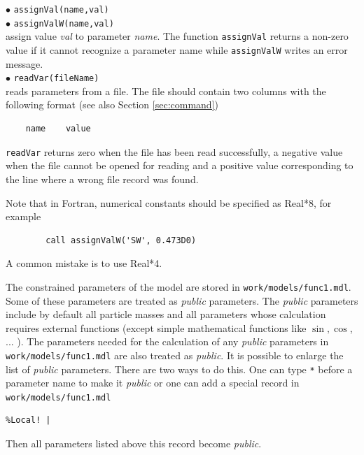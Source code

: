 \documentclass[12pt,a4paper]{article}
\begin{document}
\noindent
$\bullet$ \verb|assignVal(name,val)|\\
$\bullet$ \verb|assignValW(name,val)|\\
assign value {\it val} to parameter {\it name}. The function  \verb|assignVal| returns a non-zero
value  if it
cannot recognize  a parameter name while \verb|assignValW| writes an error message.  \\
$\bullet$ \verb|readVar(fileName)|\\
reads parameters from a file. The file  should contain two columns with the 
 following  format (see also Section \ref{sec:command})
\begin{verbatim}
    name    value
\end{verbatim}
\verb|readVar| returns zero when
the file has been read successfully, a negative value when the
file cannot be opened for reading and  a positive  value 
corresponding to the line where a wrong file record was found.

Note that in  Fortran, numerical constants should be specified as  Real*8, for example
\begin{verbatim}     
        call assignValW('SW', 0.473D0) 
\end{verbatim}
A common mistake is to use Real*4.  


The constrained parameters of the model are stored in \verb|work/models/func1.mdl|. Some of
these parameters are treated as {\it public} parameters. The {\it public} parameters include 
by default all particle masses 
and all parameters  whose calculation requires external functions (except simple
mathematical functions like $\sin,\cos$, ... ). The parameters needed for the calculation of any 
{\it public} parameters in  \verb|work/models/func1.mdl|
are also treated as {\it public}. 
It is possible to enlarge the list of {\it public} parameters. There are two ways to do this. 
One can type \verb|*| before a parameter name to make it {\it public} or one 
can add a  special record in \verb|work/models/func1.mdl|
\begin{verbatim}
%Local! |   
\end{verbatim}
Then all parameters listed above this record  become {\it public}. 
\end{document}
